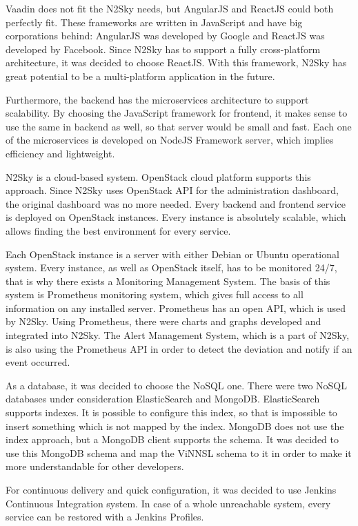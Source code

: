  Vaadin does not fit the N2Sky needs, but AngularJS and ReactJS could both perfectly fit. These frameworks are written in JavaScript and have big corporations behind: AngularJS was developed by Google and ReactJS was developed by Facebook. Since N2Sky has to support a fully cross-platform architecture, it was decided to choose ReactJS. With this framework, N2Sky has great potential to be a multi-platform application in the future. 
 

Furthermore, the backend has the microservices architecture to support scalability. By choosing the JavaScript framework for frontend, it makes sense to use the same in backend as well, so that server would be small and fast. Each one of the microservices is developed on NodeJS Framework server, which implies efficiency and lightweight. 

N2Sky is a cloud-based system. OpenStack cloud platform supports this approach. Since N2Sky uses OpenStack API for the administration dashboard, the original dashboard was no more needed. Every backend and frontend service is deployed on OpenStack instances. Every instance is absolutely scalable, which allows finding the best environment for every service. 

Each OpenStack instance is a server with either Debian or Ubuntu operational system. Every instance, as well as OpenStack itself, has to be monitored 24/7, that is why there exists a Monitoring Management System. The basis of this system is Prometheus monitoring system, which gives full access to all information on any installed server. Prometheus has an open API, which is used by N2Sky. Using Prometheus, there were charts and graphs developed and integrated into N2Sky. The Alert Management System, which is a part of N2Sky, is also using the Prometheus API in order to detect the deviation and notify if an event occurred.

As a database, it was decided to choose the NoSQL one. There were two NoSQL databases under consideration ElasticSearch and MongoDB. 
ElasticSearch supports indexes. It is possible to configure this index, so that is impossible to insert something which is not mapped by the index. MongoDB does not use the index approach, but a MongoDB client supports the schema. It was decided to use this MongoDB schema and map the ViNNSL schema to it in order to make it more understandable for other developers. 

For continuous delivery and quick configuration, it was decided to use Jenkins Continuous Integration system. In case of a whole unreachable system, every service can be restored with a Jenkins Profiles.


